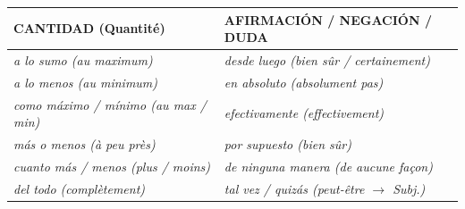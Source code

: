 \documentclass[11pt]{article}
\newcommand{\esp}[1]{\ifmmode\text{\textit{#1}}\else\begingroup\selectlanguage{spanish}\itshape #1\endgroup\fi}
\begin{document}
\begin{propriete}
\begin{center}
\begin{tabularx}{\linewidth}{|X|X|X|}
\end{tabularx}
\end{center}
\begin{center}
\begin{tabularx}{\linewidth}{|X|X|}
\hline
\rowcolor{poporangeL} \textbf{CANTIDAD (Quantité)} & \textbf{AFIRMACIÓN / NEGACIÓN / DUDA} \\ \hline
\esp{a lo sumo} (au maximum) & \esp{desde luego} (bien sûr / certainement) \\ \hline
\esp{a lo menos} (au minimum) & \esp{en absoluto} (absolument pas) \\ \hline
\esp{como máximo / mínimo} (au max / min) & \esp{efectivamente} (effectivement) \\ \hline
\esp{más o menos} (à peu près) & \esp{por supuesto} (bien sûr) \\ \hline
\esp{cuanto más / menos} (plus / moins) & \esp{de ninguna manera} (de aucune façon) \\ \hline
\esp{del todo} (complètement) & \esp{tal vez / quizás} (peut-être $\rightarrow$ Subj.) \\ \hline
\end{tabularx}
\end{center}
\end{propriete}
\end{document}
